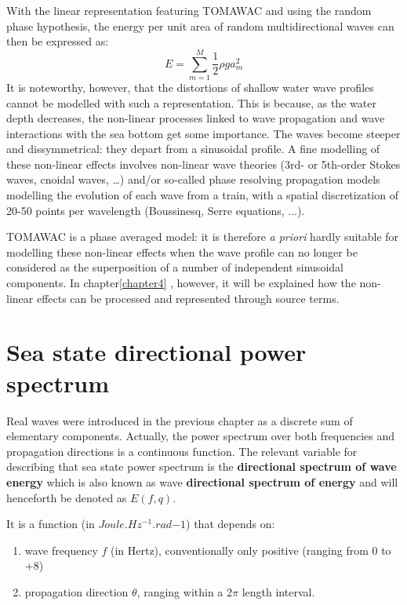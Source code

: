  With the linear representation featuring TOMAWAC and using the random phase hypothesis, the energy per unit area of random multidirectional waves can then be expressed as:
\begin{equation} \label{GrindEQ__2_5_}
E=\sum _{m=1}^{M}\frac{1}{2} \rho ga_{m}^{2}
\end{equation}
It is noteworthy, however, that the distortions of shallow water wave profiles cannot be modelled with such a representation. This is because, as the water depth decreases, the non-linear processes linked to wave propagation and wave interactions with the sea bottom get some importance. The waves become steeper and dissymmetrical: they depart from a sinusoidal profile. A fine modelling of these non-linear effects involves non-linear wave theories (3rd- or 5th-order Stokes waves, cnoidal waves, \dots ) and/or so-called phase resolving propagation models modelling the evolution of each wave from a train, with a spatial discretization of 20-50 points per wavelength (Boussinesq, Serre equations, ...).

 TOMAWAC is a phase averaged model: it is therefore \textit{a priori} hardly suitable for modelling these non-linear effects when the wave profile can no longer be considered as the superposition of a number of independent sinusoidal components. In chapter\ref{chapter4} , however, it will be explained how the non-linear effects can be processed and represented through source terms.


\section{ Sea state directional power spectrum}

 Real waves were introduced in the previous chapter as a discrete sum of elementary components. Actually, the power spectrum over both frequencies and propagation directions is a continuous function. The relevant variable for describing that sea state power spectrum is the \textbf{directional spectrum of wave energy} which is also known as wave \textbf{directional spectrum of energy} and will henceforth be denoted as $E(f,q)$.

 It is a function (in $Joule.Hz^{-1}.rad{-1}$) that depends on:

 \begin{enumerate}
\item wave frequency $f$ (in Hertz), conventionally only positive (ranging from 0 to +8)
 \item propagation direction $\theta$, ranging within a $2\pi$ length interval.
\end{enumerate}

